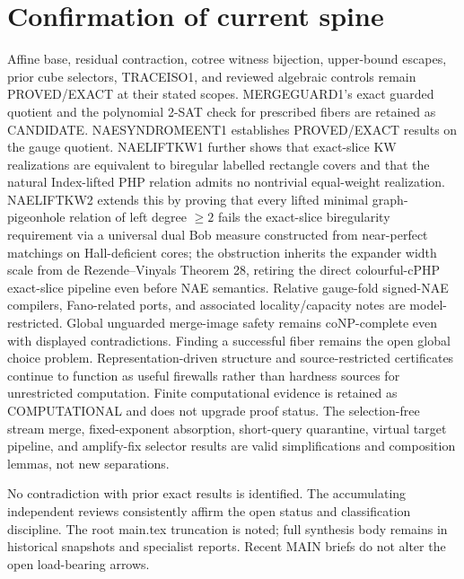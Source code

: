 \documentclass[11pt]{article}
\begin{document}
\section{Confirmation of current spine}
Affine base, residual contraction, cotree witness bijection, upper-bound escapes, prior cube selectors, TRACEISO1, and reviewed algebraic controls remain PROVED/EXACT at their stated scopes. MERGEGUARD1's exact guarded quotient and the polynomial 2-SAT check for prescribed fibers are retained as CANDIDATE. NAESYNDROMEENT1 establishes PROVED/EXACT results on the gauge quotient. NAELIFTKW1 further shows that exact-slice KW realizations are equivalent to biregular labelled rectangle covers and that the natural Index-lifted PHP relation admits no nontrivial equal-weight realization. NAELIFTKW2 extends this by proving that every lifted minimal graph-pigeonhole relation of left degree $\ge 2$ fails the exact-slice biregularity requirement via a universal dual Bob measure constructed from near-perfect matchings on Hall-deficient cores; the obstruction inherits the expander width scale from de Rezende--Vinyals Theorem 28, retiring the direct colourful-cPHP exact-slice pipeline even before NAE semantics. Relative gauge-fold signed-NAE compilers, Fano-related ports, and associated locality/capacity notes are model-restricted. Global unguarded merge-image safety remains coNP-complete even with displayed contradictions. Finding a successful fiber remains the open global choice problem. Representation-driven structure and source-restricted certificates continue to function as useful firewalls rather than hardness sources for unrestricted computation. Finite computational evidence is retained as COMPUTATIONAL and does not upgrade proof status. The selection-free stream merge, fixed-exponent absorption, short-query quarantine, virtual target pipeline, and amplify-fix selector results are valid simplifications and composition lemmas, not new separations.

No contradiction with prior exact results is identified. The accumulating independent reviews consistently affirm the open status and classification discipline. The root main.tex truncation is noted; full synthesis body remains in historical snapshots and specialist reports. Recent MAIN briefs do not alter the open load-bearing arrows.
\end{document}

